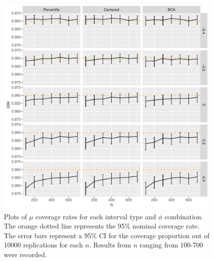 \documentclass[12pt, letterpaper, titlepage]{article}
\begin{document}
\begin{figure}[tbp]
  \centering
  \includegraphics[width=\textwidth]{figures/plot_mu}
  \caption{Plots of $\mu$ coverage rates for each interval type and $\phi$
    combination. The orange dotted line represents the 95\% nominal coverage
    rate. The error bars represent a 95\% CI for the coverage
    proportion out of 10000 replications for each $n$. Results from $n$
    ranging from 100-700 were recorded.}
  \label{fig:mu}
\end{figure}
\end{document}
